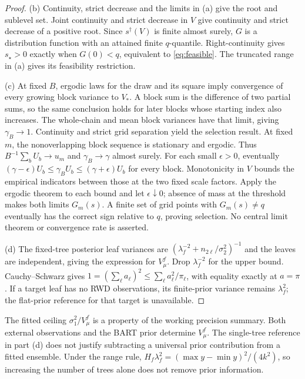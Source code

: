 \documentclass[11pt]{article}
\theoremstyle{definition}
\theoremstyle{plain}
\begin{document}
{\begin{proof}
(b) Continuity, strict decrease and the limits in (a) give the root and sublevel set. Joint continuity and strict decrease in $V$ give continuity and strict decrease of a positive root. Since $s^\dagger(V)$ is finite almost surely, $G$ is a distribution function with an attained finite $q$-quantile. Right-continuity gives $s_\star>0$ exactly when $G(0)<q$, equivalent to \eqref{eq:feasible}. The truncated range in (a) gives its feasibility restriction.

(c) At fixed $B$, ergodic laws for the draw and its square imply convergence of every growing block variance to $V_*$. A block sum is the difference of two partial sums, so the same conclusion holds for later blocks whose starting index also increases. The whole-chain and mean block variances have that limit, giving $\gamma_B\to1$. Continuity and strict grid separation yield the selection result.
At fixed $m$, the nonoverlapping block sequence is stationary and ergodic. Thus $B^{-1}\sum_bU_b\to u_m$ and $\gamma_B\to\gamma$ almost surely. For each small $\epsilon>0$, eventually $(\gamma-\epsilon)U_b\le\gamma_BU_b\le(\gamma+\epsilon)U_b$ for every block. Monotonicity in $V$ bounds the empirical indicators between those at the two fixed scale factors. Apply the ergodic theorem to each bound and let $\epsilon\downarrow0$; absence of mass at the threshold makes both limits $G_m(s)$. A finite set of grid points with $G_m(s)\ne q$ eventually has the correct sign relative to $q$, proving selection. No central limit theorem or convergence rate is asserted.

(d) The fixed-tree posterior leaf variances are $(\lambda_f^{-2}+n_{2\ell}/\sigma_2^2)^{-1}$ and the leaves are independent, giving the expression for $V_\mu^f$. Drop $\lambda_f^{-2}$ for the upper bound. Cauchy--Schwarz gives $1=(\sum_\ell a_\ell)^2\le\sum_\ell a_\ell^2/\pi_\ell$, with equality exactly at $a=\pi$. If a target leaf has no RWD observations, its finite-prior variance remains $\lambda_f^2$; the flat-prior reference for that target is unavailable.
\end{proof}

\begin{remA}\label{rem:units}
The fitted ceiling $\sigma_1^2/V_\mu^f$ is a property of the working precision summary. Both external observations and the BART prior determine $V_\mu^f$. The single-tree reference in part (d) does not justify subtracting a universal prior contribution from a fitted ensemble. Under the range rule, $H_f\lambda_f^2=(\max y-\min y)^2/(4k^2)$, so increasing the number of trees alone does not remove prior information.
\end{remA}

}
\end{document}

